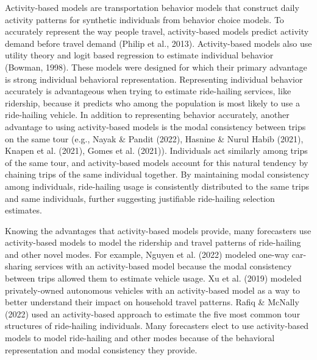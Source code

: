 \documentclass[fancy, masters]{byuthesis}
\begin{document}
Activity-based models are transportation behavior models that construct daily activity patterns for synthetic individuals from behavior choice models. To accurately represent the way people travel, activity-based models predict activity demand before travel demand (Philip et al., 2013). Activity-based models also use utility theory and logit based regression to estimate individual behavior (Bowman, 1998). These models were designed for which their primary advantage is strong individual behavioral representation. Representing individual behavior accurately is advantageous when trying to estimate ride-hailing services, like ridership, because it predicts who among the population is most likely to use a ride-hailing vehicle. In addition to representing behavior accurately, another advantage to using activity-based models is the modal consistency between trips on the same tour (e.g., Nayak \& Pandit (2022), Hasnine \& Nurul Habib (2021), Knapen et al. (2021), Gomes et al. (2021)). Individuals act similarly among trips of the same tour, and activity-based models account for this natural tendency by chaining trips of the same individual together. By maintaining modal consistency among individuals, ride-hailing usage is consistently distributed to the same trips and same individuals, further suggesting justifiable ride-hailing selection estimates.

Knowing the advantages that activity-based models provide, many forecasters use activity-based models to model the ridership and travel patterns of ride-hailing and other novel modes. For example, Nguyen et al. (2022) modeled one-way car-sharing services with an activity-based model because the modal consistency between trips allowed them to estimate vehicle usage. Xu et al. (2019) modeled privately-owned autonomous vehicles with an activity-based model as a way to better understand their impact on household travel patterns. Rafiq \& McNally (2022) used an activity-based approach to estimate the five most common tour structures of ride-hailing individuals. Many forecasters elect to use activity-based models to model ride-hailing and other modes because of the behavioral representation and modal consistency they provide.
\end{document}
